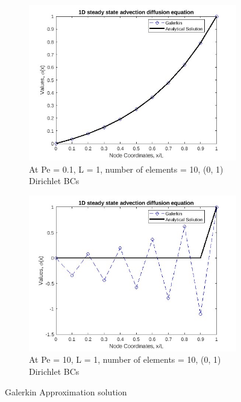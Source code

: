 \documentclass[12pt, oneside]{article}
\begin{document}
\begin{figure}[!h]
    \centering
    \begin{subfigure}[!h]{0.45\textwidth}
	\includegraphics[width=\textwidth]{pe01_no_source.jpg}
	\caption{At Pe = 0.1, L = 1, number of elements = 10, (0, 1) Dirichlet BCs}
	\label{fig-gal-1}
    \end{subfigure}
    \hfill
    \begin{subfigure}[!h]{0.45\textwidth}
	\includegraphics[width=\textwidth]{pe10_no_source.jpg}
	\caption{At Pe = 10, L = 1, number of elements = 10, (0, 1) Dirichlet BCs}
	\label{fig-gal-2}
    \end{subfigure}
    \caption{Galerkin Approximation solution}
\end{figure}
\end{document}

